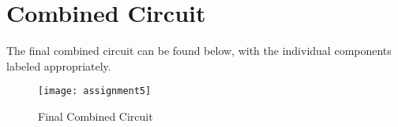 \graphicspath{{content/4_implementation/figures/}}
\section{Combined Circuit}

The final combined circuit can be found below, with the individual components labeled appropriately.

\begin{figure}[!htb]
    \centering
    \texttt{[image: assignment5]}
    \caption{Final Combined Circuit}
  \end{figure}